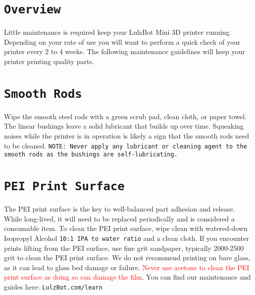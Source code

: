 %
%
%
%
%

\section{\texttt{Overview}}
Little maintenance is required keep your LulzBot Mini 3D printer running. Depending on your rate of use you will want to perform a quick check of your printer every 2 to 4 weeks. The following maintenance guidelines will keep your printer printing quality parts.

\section{\texttt{Smooth Rods}}
Wipe the smooth steel rods with a green scrub pad, clean cloth, or paper towel. The linear bushings leave a solid lubricant that builds up over time. Squeaking noises while the printer is in operation is likely a sign that the smooth rods need to be cleaned. \texttt{NOTE: Never apply any lubricant or cleaning agent to the smooth rods as the bushings are self-lubricating.}


\section{\texttt{PEI Print Surface}}
The PEI print surface is the key to well-balanced part adhesion and release. While long-lived, it will need to be replaced periodically and is considered a consumable item. To clean the PEI print surface, wipe clean with watered-down Isopropyl Alcohol \texttt{10:1 IPA to water ratio} and a clean cloth. If you encounter prints lifting from the PEI surface, use fine grit sandpaper, typically 2000-2500 grit to clean the PEI print surface. We do not recommend printing on bare glass, as it can lead to glass bed damage or failure. \textcolor{red}{Never use acetone to clean the PEI print surface as doing so can damage the film}. You can find our maintenance and guides here:
\texttt{LulzBot.com/learn}

